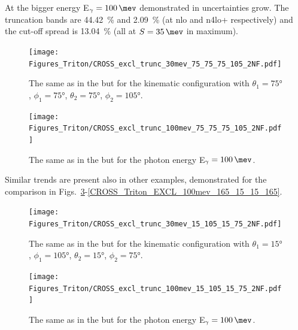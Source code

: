     At the bigger energy E$_\gamma=\SI{100}{\mev}$ demonstrated in 
    uncertainties grow. The truncation bands are \SI{44.42}{\percent} and 
    \SI{2.09}{\percent} (at \gls{nlo} and \gls{n4lo+} respectively) and
    the cut-off spread is \SI{13.04}{\percent} (all at $S=\SI{35}{\mev}$ in maximum).


    \begin{figure}[h]
        \begin{center}
            \texttt{[image: Figures\_Triton/CROSS\_excl\_trunc\_30mev\_75\_75\_75\_105\_2NF.pdf]}
            \end{center}
            \caption{The same as in the  but for the kinematic
            configuration with
            $\theta_1 = \ang{75}$, $\phi_1 = \ang{75}$,
            $\theta_2 = \ang{75}$, $\phi_2 = \ang{105}$.}
            \label{CROSS_Triton_EXCL_75_75_75_105}
    \end{figure}


    \begin{figure}[h]
        \begin{center}
            \texttt{[image: Figures\_Triton/CROSS\_excl\_trunc\_100mev\_75\_75\_75\_105\_2NF.pdf]}
            \end{center}
            \caption{The same as in the  but for the photon energy
            E$_\gamma = \SI{100}{\mev}$.}
            \label{CROSS_Triton_EXCL_100mev_75_75_75_105}
    \end{figure}

    Similar trends are present also in other examples, demonstrated for the comparison in
    Figs.~\ref{CROSS_Triton_EXCL_15_105_15_75}-\ref{CROSS_Triton_EXCL_100mev_165_15_15_165}.

    \begin{figure}[h]
        \begin{center}
            \texttt{[image: Figures\_Triton/CROSS\_excl\_trunc\_30mev\_15\_105\_15\_75\_2NF.pdf]}
            \end{center}
            \caption{The same as in the  but for the kinematic
            configuration with
            $\theta_1 = \ang{15}$, $\phi_1 = \ang{105}$,
            $\theta_2 = \ang{15}$, $\phi_2 = \ang{75}$.}
            \label{CROSS_Triton_EXCL_15_105_15_75}
    \end{figure}


    \begin{figure}[h]
        \begin{center}
            \texttt{[image: Figures\_Triton/CROSS\_excl\_trunc\_100mev\_15\_105\_15\_75\_2NF.pdf]}
            \end{center}
            \caption{The same as in the  but for the photon energy
            E$_\gamma = \SI{100}{\mev}$.}
            \label{CROSS_Triton_EXCL_100mev_15_105_15_75}
    \end{figure}

